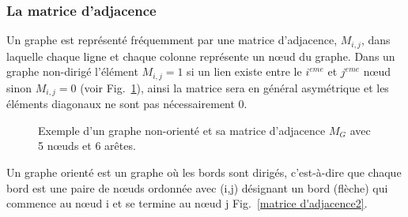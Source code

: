   \subsubsection{La matrice d’adjacence}
 Un graphe est représenté fréquemment par une matrice d'adjacence, $M_{i,j}$, dans laquelle chaque ligne et
 chaque colonne représente un nœud du graphe. Dans un graphe non-dirigé l'élément $M_{i,j}=1$ si un lien existe entre le $i^{eme}$ et $j^{eme}$
 nœud sinon $M_{i,j}=0$  (voir Fig.~\ref{matrice d'adjacence}), ainsi la matrice sera en général asymétrique et les éléments diagonaux ne sont pas
 nécessairement $0$.
  \begin{figure}[h]
 	\centering
 	\caption{Exemple d'un graphe non-orienté et sa matrice d'adjacence $M_G$ avec 5 nœuds et 6 arêtes.}
 	\label{matrice d'adjacence}
 \end{figure}  
 
  Un graphe orienté est un graphe où les bords sont dirigés, c'est-à-dire que chaque bord est une paire de nœuds ordonnée avec ($\mathrm{i}$,$\mathrm{j}$) désignant un bord (flèche) qui commence au nœud $\mathrm{i}$ et se termine au nœud $\mathrm{j}$ Fig.~\ref{matrice d'adjacence2}. 
 
